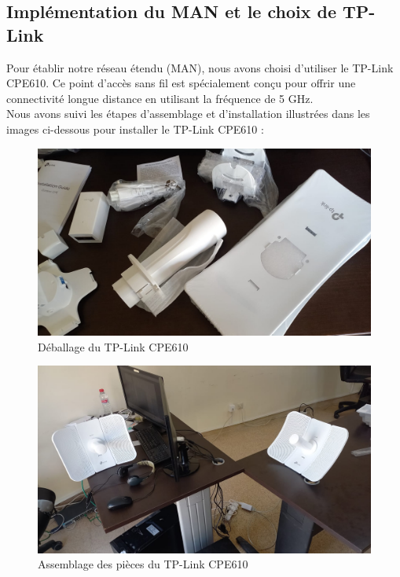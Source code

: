 \subsection{Implémentation du MAN et le choix de TP-Link}

Pour établir notre réseau étendu (MAN), nous avons choisi d'utiliser le TP-Link CPE610. Ce point d'accès sans fil est spécialement conçu pour offrir une connectivité longue distance en utilisant la fréquence de 5 GHz. \\

Nous avons suivi les étapes d'assemblage et d'installation illustrées dans les images ci-dessous pour installer le TP-Link CPE610 : \\

\begin{figure}[H]
\centering
\includegraphics[width=15cm]{Images/SetupTPL4.jpg}
\caption{Déballage du TP-Link CPE610}
\label{Chap2.3.2}
\end{figure}

\begin{figure}[H]
\centering
\includegraphics[width=15cm]{Images/SetupTPL1.jpg}
\caption{Assemblage des pièces du TP-Link CPE610}
\label{Chap2.3.4}
\end{figure}

